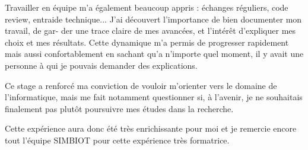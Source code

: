 \documentclass[12pt]{report}
\begin{document}
\bigskip

Travailler en équipe m'a également beaucoup appris : échanges réguliers, code review,
entraide technique... J'ai découvert l'importance de bien documenter mon travail, de gar-
der une trace claire de mes avancées, et l'intérêt d'expliquer mes choix et mes résultats.
Cette dynamique m'a permis de progresser rapidement mais aussi confortablement en
sachant qu'a n'importe quel moment, il y avait une personne à qui je pouvais demander
des explications.

\bigskip

Ce stage a renforcé ma conviction de vouloir m'orienter vers le domaine de l'informatique,
mais me fait notamment questionner si, à l'avenir, je ne souhaitais finalement pas plutôt
poursuivre mes études dans la recherche. 

\bigskip

Cette expérience aura donc été très enrichissante pour moi et je remercie encore tout l'équipe SIMBIOT pour cette expérience très formatrice.
\printbibliography
\end{document}
